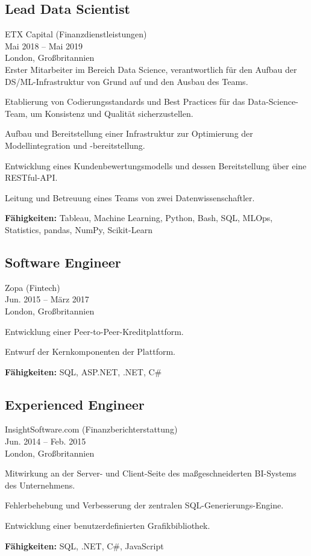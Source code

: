 \documentclass[a4paper,10pt]{article}
\begin{document}
\subsection*{Lead Data Scientist}
ETX Capital (Finanzdienstleistungen) \\
Mai 2018 – Mai 2019 \\
London, Großbritannien \\
Erster Mitarbeiter im Bereich Data Science, verantwortlich für den Aufbau der DS/ML-Infrastruktur von Grund auf und den Ausbau des Teams.
\begin{bulletlist}
    \item Etablierung von Codierungsstandards und Best Practices für das Data-Science-Team, um Konsistenz und Qualität sicherzustellen.
    \item Aufbau und Bereitstellung einer Infrastruktur zur Optimierung der Modellintegration und -bereitstellung.
    \item Entwicklung eines Kundenbewertungsmodells und dessen Bereitstellung über eine RESTful-API.
    \item Leitung und Betreuung eines Teams von zwei Datenwissenschaftler.
\end{bulletlist}
\textbf{Fähigkeiten: }Tableau, Machine Learning, Python, Bash, SQL, MLOps, Statistics, pandas, NumPy, Scikit-Learn

\subsection*{Software Engineer}
Zopa (Fintech) \\
Jun. 2015 – März 2017 \\
London, Großbritannien
\begin{bulletlist}
    \item Entwicklung einer Peer-to-Peer-Kreditplattform.
    \item Entwurf der Kernkomponenten der Plattform.
\end{bulletlist}
\textbf{Fähigkeiten:} SQL, ASP.NET, .NET, C\#

\subsection*{Experienced Engineer}
InsightSoftware.com (Finanzberichterstattung) \\
Jun. 2014 – Feb. 2015 \\
London, Großbritannien
\begin{bulletlist}
    \item Mitwirkung an der Server- und Client-Seite des maßgeschneiderten BI-Systems des Unternehmens.
    \item Fehlerbehebung und Verbesserung der zentralen SQL-Generierungs-Engine.
    \item Entwicklung einer benutzerdefinierten Grafikbibliothek.
\end{bulletlist}
\textbf{Fähigkeiten:} SQL, .NET, C\#, JavaScript
\end{document}

